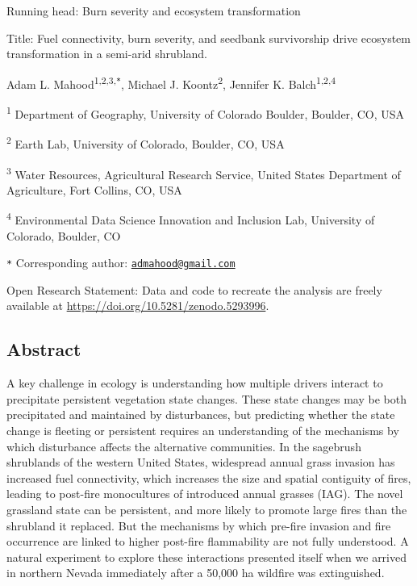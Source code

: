 \documentclass[
  12pt,
]{article}
\author{}
\date{\vspace{-2.5em}}
\begin{document}

Running head: Burn severity and ecosystem transformation

Title: Fuel connectivity, burn severity, and seedbank survivorship drive
ecosystem transformation in a semi-arid shrubland.

Adam L. Mahood\textsuperscript{1,2,3,\texttt{*}}, Michael J.
Koontz\textsuperscript{2}, Jennifer K. Balch\textsuperscript{1,2,4}

\small

\textsuperscript{1} Department of Geography, University of Colorado
Boulder, Boulder, CO, USA

\textsuperscript{2} Earth Lab, University of Colorado, Boulder, CO, USA

\textsuperscript{3} Water Resources, Agricultural Research Service,
United States Department of Agriculture, Fort Collins, CO, USA

\textsuperscript{4} Environmental Data Science Innovation and Inclusion
Lab, University of Colorado, Boulder, CO

\texttt{*} Corresponding author:
\href{mailto:admahood@gmail.com}{\nolinkurl{admahood@gmail.com}}

\normalsize

Open Research Statement: Data and code to recreate the analysis are
freely available at \url{https://doi.org/10.5281/zenodo.5293996}.

\newpage

\linenumbers

\hypertarget{abstract}{%
\subsection{Abstract}\label{abstract}}

A key challenge in ecology is understanding how multiple drivers
interact to precipitate persistent vegetation state changes. These state
changes may be both precipitated and maintained by disturbances, but
predicting whether the state change is fleeting or persistent requires
an understanding of the mechanisms by which disturbance affects the
alternative communities. In the sagebrush shrublands of the western
United States, widespread annual grass invasion has increased fuel
connectivity, which increases the size and spatial contiguity of fires,
leading to post-fire monocultures of introduced annual grasses (IAG).
The novel grassland state can be persistent, and more likely to promote
large fires than the shrubland it replaced. But the mechanisms by which
pre-fire invasion and fire occurrence are linked to higher post-fire
flammability are not fully understood. A natural experiment to explore
these interactions presented itself when we arrived in northern Nevada
immediately after a 50,000 ha wildfire was extinguished.
\end{document}
